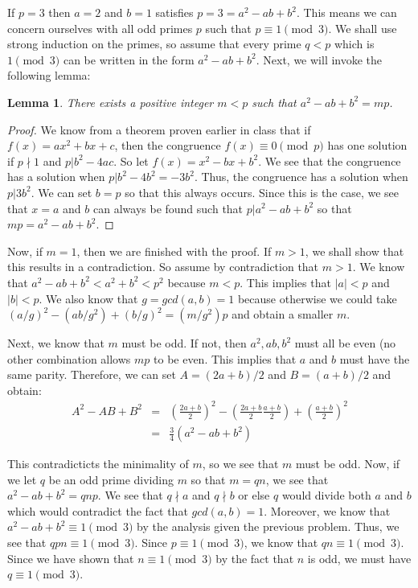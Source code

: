 \documentclass[psamsfonts]{amsart}
\newtheorem{lem}[thm]{Lemma}
\newenvironment{sol}{{\bfseries Solution}}{\qedsymbol}
\theoremstyle{definition}
\theoremstyle{remark}
\numberwithin{equation}{section}
\begin{document}
\begin{sol}
If $p =3 $ then $a = 2$ and $b=1$ satisfies $p = 3 = a^2 - ab + b^2$. This means we can concern ourselves with all odd primes $p$ such that $p \equiv 1 \pmod{3}$. We shall use strong induction on the primes, so assume that every prime $q < p$ which is $1 \pmod{3}$ can be written in the form $a^2 -ab + b^2$. Next, we will invoke the following lemma:

\begin{lem}
There exists a positive integer $m < p$ such that $a^2 -ab +  b^2 = mp$. 
\end{lem}

\begin{proof}
We know from a theorem proven earlier in class that if $f(x) = ax^2 + bx + c$, then the congruence $f(x) \equiv 0 \pmod{p}$ has one solution if $p \nmid 1$ and $p | b^2 - 4ac$. So let $f(x) = x^2 - bx + b^2$. We see that the congruence has a solution when $p | b^2 - 4b^2 = - 3b^2$. Thus, the congruence has a solution when $p | 3b^2$. We can set $b = p$ so that this always occurs. Since this is the case, we see that $x=a$ and $b$ can always be found such that $p | a^2 - ab + b^2$ so that $mp = a^2 - ab + b^2$.  
\end{proof}

Now, if $m = 1$, then we are finished with the proof. If $m > 1$, we shall show that this results in a contradiction. So assume by contradiction that $m > 1$. We know that $a^2 - ab + b^2 < a^2 + b^2 < p^2$ because $m < p$. This implies that $|a| <p$ and $|b| < p$. We also know that $g = gcd(a,b) = 1$ because otherwise we could take $(a/g)^2 - (ab/g^2) + (b/g)^2 = (m/g^2) p$ and obtain a smaller $m$. 

Next, we know that $m$ must be odd. If not, then $a^2, ab, b^2$ must all be even (no other combination allows $mp$ to be even. This implies that $a$ and $b$ must have the same parity. Therefore, we can set $A = (2a + b)/2$ and $B= (a + b)/2$ and obtain:
\begin{eqnarray}
A^2 - AB + B^2 &=& \left( \frac{2a + b}{2} \right)^2 - \left( \frac{2a + b}{2} \frac{a + b}{2} \right) + \left( \frac{a+b}{2} \right)^2 \\
&=& \frac{3}{4} \left( a^2 - ab + b^2 \right)
\end{eqnarray}

This contradicticts the minimality of $m$, so we see that $m$ must be odd. Now, if we let $q$ be an odd prime dividing $m$ so that $m = q n$, we see that $a^2 - ab + b^2 = q n p$. We see that $q \nmid a$ and $q \nmid b$ or else $q$ would divide both $a$ and $b$ which would contradict the fact that $gcd(a,b) = 1$. Moreover, we know that $a^2 - ab + b^2 \equiv 1 \pmod{3}$ by the analysis given the previous problem. Thus, we see that $q p n \equiv 1 \pmod{3}$. Since $p \equiv 1 \pmod{3}$, we know that $qn \equiv 1 \pmod{3}$. Since we have shown that $n \equiv 1 \pmod{3}$ by the fact that $n$ is odd, we must have $q \equiv 1 \pmod{3}$. 


\end{sol}
\end{document}
